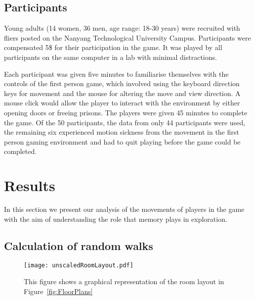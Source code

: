 \subsection{Participants} %
\label{sec:experiment_details}

Young adults (14 women, 36 men, age range: 18-30 years) were recruited with fliers posted on the Nanyang Technological University Campus. Participants were compensated 5\$ for their participation in the game. It was played by all participants on the same computer in a lab with minimal distractions.

Each participant was given five minutes to familiarise themselves with the controls of the first person game, which involved using the keyboard direction keys for movement and the mouse for altering the move and view direction. A mouse click would allow the player to interact with the environment by either opening doors or freeing prisons. The players were given 45 minutes to complete the game. Of the 50 participants, the data from only 44 participants were used, the remaining six experienced motion sickness from the movement in the first person gaming environment and had to quit playing before the game could be completed.



\section{Results} %
\label{sec:analysis_of_experiment_results}

In this section we present our analysis of the movements of players in the game with the aim of understanding the role that memory plays in exploration.

\subsection{Calculation of random walks}

\begin{sidewaysfigure*}[!htbp]
\centering
\texttt{[image: unscaledRoomLayout.pdf]}
\caption{This figure shows a graphical representation of the room layout in Figure~\ref{fig:FloorPlans}}
\label{fig:UnscaledMap}
\end{sidewaysfigure*}



